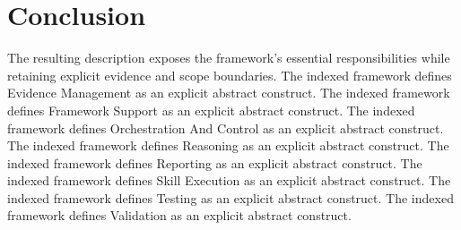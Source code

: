 \section{Conclusion}

The resulting description exposes the framework's essential responsibilities while retaining explicit evidence and scope boundaries. The indexed framework defines Evidence Management as an explicit abstract construct. The indexed framework defines Framework Support as an explicit abstract construct. The indexed framework defines Orchestration And Control as an explicit abstract construct. The indexed framework defines Reasoning as an explicit abstract construct. The indexed framework defines Reporting as an explicit abstract construct. The indexed framework defines Skill Execution as an explicit abstract construct. The indexed framework defines Testing as an explicit abstract construct. The indexed framework defines Validation as an explicit abstract construct.
